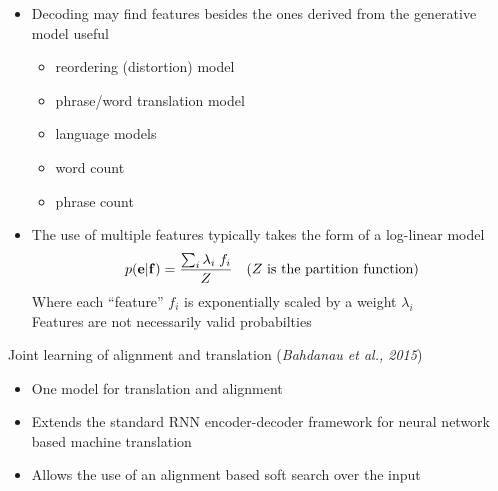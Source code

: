 \documentclass[landscape]{jhuslides3C}
\newcommand{\maths}[1]{\textcolor{purple}{#1}}
\begin{document}
\begin{itemize}
\item Decoding may find features besides the ones derived from the generative model useful
\begin{itemize}
\item reordering (distortion) model
\item phrase/word translation model
\item language models
\item word count
\item phrase count
\end{itemize}
\item The use of multiple features typically takes the form of a log-linear model
\maths{\begin{align*} 
p({\bf e}|{\bf f}) = \frac{\sum_i \lambda_i \; f_i}{Z} && (Z \text{ is the partition function})
\end{align*}} 
Where each ``feature'' $f_i$ is exponentially scaled by a weight $\lambda_i$\\
Features are not necessarily valid probabilties
\end{itemize}


Joint learning of alignment and translation (\textit{Bahdanau et al., 2015})
\begin{itemize}
	\item One model for translation and alignment
	\item Extends the standard RNN encoder-decoder framework for neural network based
			machine translation
	\item Allows the use of an alignment based soft search over the input
\end{itemize}

\end{document}

